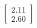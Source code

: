 \documentclass[preview]{standalone}
\begin{document}
\begin{align*}
\begin{bmatrix} 2.11 \\ 2.60 \end{bmatrix}
\end{align*}
\end{document}
